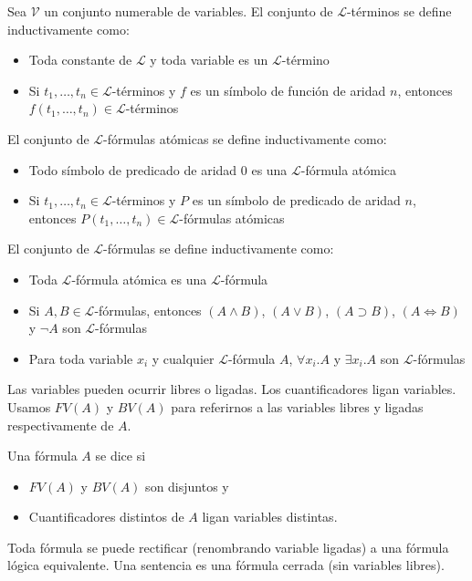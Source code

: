 Sea $\mathcal{V}$ un conjunto numerable de variables. El conjunto de $\mathcal{L}$-términos se define inductivamente como:
\begin{itemize}
  \item Toda constante de $\mathcal{L}$ y toda variable es un $\mathcal{L}$-término
  \item Si $t_1,\dots,t_n \in \mathcal{L}$-términos y $f$ es un símbolo de función de aridad $n$, entonces $f(t_1,\dots,t_n) \in \mathcal{L}$-términos
\end{itemize}

El conjunto de $\mathcal{L}$-fórmulas atómicas se define inductivamente como:
\begin{itemize}
  \item Todo símbolo de predicado de aridad 0 es una $\mathcal{L}$-fórmula atómica
  \item Si $t_1,\dots,t_n \in \mathcal{L}$-términos y $P$ es un símbolo de predicado de aridad $n$, entonces $P(t_1,\dots,t_n) \in \mathcal{L}$-fórmulas atómicas
\end{itemize}

El conjunto de $\mathcal{L}$-fórmulas se define inductivamente como:
\begin{itemize}
  \item Toda $\mathcal{L}$-fórmula atómica es una $\mathcal{L}$-fórmula
  \item Si $A,B \in \mathcal{L}$-fórmulas, entonces $(A \land B)$, $(A \lor B)$, $(A \supset B)$, $(A \iff B)$ y $\lnot A$ son $\mathcal{L}$-fórmulas
  \item Para toda variable $x_i$ y cualquier $\mathcal{L}$-fórmula $A$, $\forall x_i.A$ y $\exists x_i.A$ son $\mathcal{L}$-fórmulas
\end{itemize}

Las variables pueden ocurrir libres o ligadas. Los cuantificadores ligan variables. Usamos $FV(A)$ y $BV(A)$ para referirnos a las variables libres y ligadas respectivamente de $A$.

Una fórmula $A$ se dice  si
\begin{itemize}
  \item $FV(A)$ y $BV(A)$ son disjuntos y
  \item Cuantificadores distintos de $A$ ligan variables distintas.
\end{itemize}

Toda fórmula se puede rectificar (renombrando variable ligadas) a una fórmula lógica equivalente. Una sentencia es una fórmula cerrada (sin variables libres).

